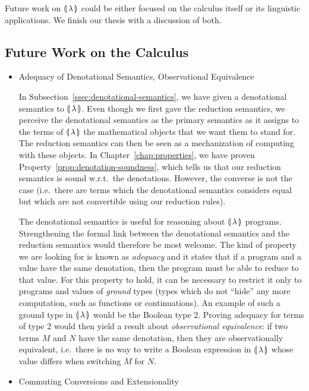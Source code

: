 Future work on ${\llparenthesis \, \lambda \, \rrparenthesis}$ could be either focused on the calculus itself or
its linguistic applications. We finish our thesis with a discussion of
both.


\subsection{Future Work on the Calculus}
\label{ssec:future-work-calculus}

\begin{itemize}
\item Adequacy of Denotational Semantics, Observational Equivalence

  In Subsection~\ref{ssec:denotational-semantics}, we have given a
  denotational semantics to ${\llparenthesis \, \lambda \, \rrparenthesis}$. Even though we first gave the
  reduction semantics, we perceive the denotational semantics as the
  primary semantics as it assigns to the terms of ${\llparenthesis \, \lambda \, \rrparenthesis}$ the mathematical
  objects that we want them to stand for. The reduction semantics can then
  be seen as a mechanization of computing with these objects. In
  Chapter~\ref{chap:properties}, we have proven
  Property~\ref{prop:denotation-soundness}, which tells us that our
  reduction semantics is sound w.r.t.\ the denotations. However, the
  converse is not the case (i.e.\ there are terms which the denotational
  semantics considers equal but which are not convertible using our
  reduction rules).

  The denotational semantics is useful for reasoning about ${\llparenthesis \, \lambda \, \rrparenthesis}$
  programs. Strengthening the formal link between the denotational
  semantics and the reduction semantics would therefore be most
  welcome. The kind of property we are looking for is known as
  \emph{adequacy} and it states that if a program and a value have the same
  denotation, then the program must be able to reduce to that value. For
  this property to hold, it can be necessary to restrict it only to
  programs and values of \emph{ground} types (types which do not ``hide''
  any more computation, such as functions or continuations). An example of
  such a ground type in ${\llparenthesis \, \lambda \, \rrparenthesis}$ would be the Boolean type $2$. Proving
  adequacy for terms of type $2$ would then yield a result about
  \emph{observational equivalence}: if two terms $M$ and $N$ have the same
  denotation, then they are observationally equivalent, i.e.\ there is no
  way to write a Boolean expression in ${\llparenthesis \, \lambda \, \rrparenthesis}$ whose value differs when
  switching $M$ for $N$.


\item Commuting Conversions and Extensionality


\end{itemize}
